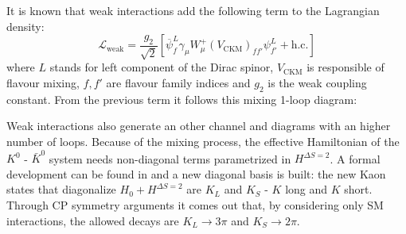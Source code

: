 \documentclass[english, LaM, oneside, noexaminfo]{sapthesis}
\newcommand{\kkb}{$K^0$ - $\bar K^0$ }
\begin{document}
It is known that weak interactions add the following term to the Lagrangian density:
\begin{equation}
    \mathcal{L}_{\text{weak}} = \frac{g_2}{\sqrt{2}} \left[ \overline \psi^L_f \gamma_\mu W^{+}_\mu (V_{\text{CKM}})_{ff'} \psi^L_{f'} + \text{h.c.} \right]
\end{equation}
where $L$ stands for left component of the Dirac spinor, $V_{\text{CKM}}$ is responsible of flavour mixing, $f,f'$ are flavour family indices and $g_2$ is the weak coupling constant.
From the previous term it follows this mixing 1-loop diagram:
\begin{center}
\end{center}
Weak interactions also generate an other channel and diagrams with an higher number of loops.
Because of the mixing process, the effective Hamiltonian of the \kkb system needs non-diagonal terms parametrized in $H^{\Delta S = 2}$.
A formal development can be found in \cite{Donoghue} and a new diagonal basis is built: the new Kaon states that diagonalize $H_0 + H^{\Delta S = 2}$ are $K_{L}$ and $K_{S}$ - $K$ long and $K$ short.
Through CP symmetry arguments it comes out that, by considering only SM interactions, the allowed decays are $K_L \rightarrow 3\pi$ and $K_S \rightarrow 2\pi$.
\end{document}
